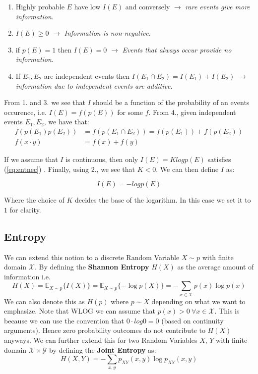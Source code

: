 \documentclass[]{article}
\theoremstyle{mattstyle}
\theoremstyle{definition}
\begin{document}
\begin{enumerate}
	\item Highly probable $E$ have low $I(E)$ and conversely $\rightarrow$ \emph{ rare events give more information}.
	\item $I(E) \ge 0$ $\rightarrow$\emph{ Information is non-negative}.
	\item if $p(E)=1$ then $I(E) = 0$ $\rightarrow$\emph{ Events that always occur provide no information}.
	\item If $E_1, E_2$ are independent events then $I(E_1 \cap E_2) = I(E_1) + I(E_2)$ $\rightarrow$\emph{ information due to independent events are additive}.
\end{enumerate}
From 1. and 3. we see that $I$ should be a function of the probability of an events occurence, i.e. $I(E)=f(p(E))$ for some $f$. From 4., given independent events $E_1, E_2$, we have that:
\begin{align}\label{eq:entnec}
f(p(E_1)p(E_2)) &= f(p(E_1\cap E_2)) = f(p(E_1)) + f(p(E_2))\\
f(x\cdot y) &= f(x) + f(y)
\end{align}

If we assume that $I$ is continuous, then only $I(E) = Klog p(E)$ satisfies (\ref{eq:entnec})  \cite{EntNotes}. Finally, using 2., we see that $K<0$. We can then define $I$ as:

\begin{equation}
I(E) = -log p(E)
\end{equation}

Where the choice of $K$ decides the base of the logarithm. In this case we set it to $1$ for clarity.

\subsection{Entropy}
We can extend this notion to a discrete Random Variable $X\sim p$ with finite domain $\mathcal{X}$. By defining the \textbf{Shannon Entropy} $H(X)$ as the average amount of information i.e. 
\begin{equation}
H(X) = \mathbb{E}_{X\sim p}\{I(X)\} = \mathbb{E}_{X\sim p}\{-\log p(X)\} = -\sum_{x\in\mathcal{X}}p(x)\log p(x)
\end{equation}
We can also denote this as $H(p)$ where $p \sim X$ depending on what we want to emphasize. Note that WLOG we can assume that \(p(x)>0 \ \forall x\in\mathcal{X}\). This is because we can use the convention that \(0\cdot log0 = 0\) (based on continuity arguments). Hence zero probability outcomes do not contribute to $H(X)$ anyways. We can further extend this for two Random Variables $X$, $Y$ with finite domain \(\mathcal{X}\times\mathcal{Y}\) by defining the \textbf{Joint Entropy} as:
\begin{equation}
H(X,Y) = -\sum_{x,y}p_{XY}(x,y)\log p_{XY}(x,y)
\end{equation}
\end{document}

